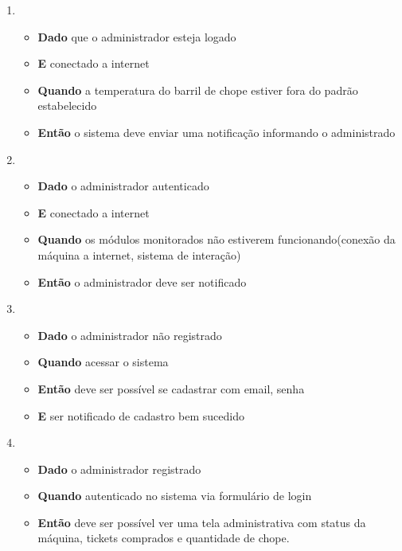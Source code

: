 \begin{enumerate}
\begin{enumerate}
					\item 
						\begin{itemize}
							\item \textbf{Dado} que o administrador esteja logado
							\item \textbf{E} conectado a internet 
							\item \textbf{Quando} a temperatura do barril de chope estiver fora do padrão estabelecido
							\item \textbf{Então} o sistema deve enviar uma notificação informando o administrado
						\end{itemize}

					\item 
						\begin{itemize}
							\item \textbf{Dado} o administrador autenticado
							\item \textbf{E} conectado a internet
							\item \textbf{Quando} os módulos monitorados não estiverem funcionando(conexão da máquina a internet, sistema de interação)
							\item \textbf{Então} o administrador deve ser notificado
						\end{itemize}

					\item 
						\begin{itemize}
							\item \textbf{Dado} o administrador não registrado
							\item \textbf{Quando} acessar o sistema
							\item \textbf{Então} deve ser possível se cadastrar com email, senha
							\item \textbf{E} ser notificado de cadastro bem sucedido
						\end{itemize}

					\item 
						\begin{itemize}
							\item \textbf{Dado} o administrador registrado
							\item \textbf{Quando} autenticado no sistema via formulário de login
							\item \textbf{Então} deve ser possível ver uma tela administrativa com status da máquina, tickets comprados e quantidade de chope.
						\end{itemize}
				\end{enumerate}


\end{enumerate}
